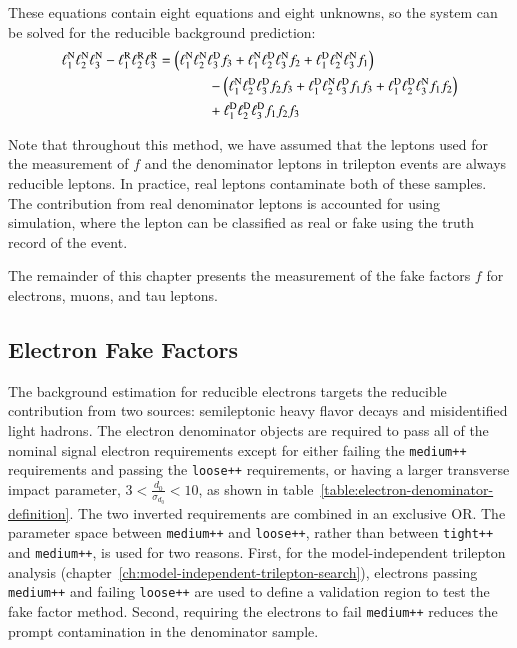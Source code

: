 These equations contain eight equations and eight unknowns, so the system can be solved for the reducible background prediction:
\begin{align} \label{eq:fake-factor-master-formula}
	\ell_{1}^{\mathrm{N}}\ell_{2}^{\mathrm{N}}\ell_{3}^{\mathrm{N}} - \ell_{1}^{\mathrm{R}}\ell_{2}^{\mathrm{R}}\ell_{3}^{\mathrm{R}} &= \left( \ell_{1}^{\mathrm{N}}\ell_{2}^{\mathrm{N}}\ell_{3}^{\mathrm{D}} f_{3} + \ell_{1}^{\mathrm{N}}\ell_{2}^{\mathrm{D}}\ell_{3}^{\mathrm{N}} f_{2}  + \ell_{1}^{\mathrm{D}}\ell_{2}^{\mathrm{N}}\ell_{3}^{\mathrm{N}} f_{1}\right)  \\
		 & \hspace{0.5in} - \left( \ell_{1}^{\mathrm{N}}\ell_{2}^{\mathrm{D}}\ell_{3}^{\mathrm{D}} f_{2}f_{3} + \ell_{1}^{\mathrm{D}}\ell_{2}^{\mathrm{N}}\ell_{3}^{\mathrm{D}} f_{1}f_{3} + \ell_{1}^{\mathrm{D}}\ell_{2}^{\mathrm{D}}\ell_{3}^{\mathrm{N}} f_{1}f_{2}\right) \\
		 & \hspace{0.5in} + \ell_{1}^{\mathrm{D}}\ell_{2}^{\mathrm{D}}\ell_{3}^{\mathrm{D}} f_{1}f_{2}f_{3}
\end{align}

Note that throughout this method, we have assumed that the leptons used for the measurement of $f$ and the denominator leptons in trilepton events are always reducible leptons. In practice, real leptons contaminate both of these samples. The contribution from real denominator leptons is accounted for using simulation, where the lepton can be classified as real or fake using the truth record of the event.

The remainder of this chapter presents the measurement of the fake factors $f$ for electrons, muons, and tau leptons. 

\subsection{Electron Fake Factors}\label{sec:electron-fake-factors}
The background estimation for reducible electrons targets the reducible contribution from two sources: semileptonic heavy flavor decays and misidentified light hadrons. The electron denominator objects are required to pass all of the nominal signal electron requirements except for either failing the \texttt{medium++} requirements and passing the \texttt{loose++} requirements, or having a larger transverse impact parameter, $3<\frac{d_0}{\sigma_{d_0}}<10$, as shown in table~\ref{table:electron-denominator-definition}. The two inverted requirements are combined in an exclusive OR. The parameter space between \texttt{medium++} and \texttt{loose++}, rather than between \texttt{tight++} and \texttt{medium++}, is used for two reasons. First, for the model-independent trilepton analysis (chapter~\ref{ch:model-independent-trilepton-search}), electrons passing \texttt{medium++} and failing \texttt{loose++} are used to define a validation region to test the fake factor method. Second, requiring the electrons to fail \texttt{medium++} reduces the prompt contamination in the denominator sample.

